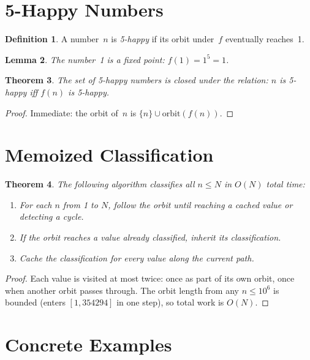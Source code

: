 \documentclass[11pt]{article}
\newtheorem{theorem}{Theorem}
\newtheorem{lemma}[theorem]{Lemma}
\theoremstyle{definition}
\newtheorem{definition}[theorem]{Definition}
\begin{document}
\section{5-Happy Numbers}

\begin{definition}
A number~$n$ is \emph{5-happy} if its orbit under~$f$ eventually reaches~1.
\end{definition}

\begin{lemma}
The number~1 is a fixed point: $f(1) = 1^5 = 1$.
\end{lemma}

\begin{theorem}
The set of 5-happy numbers is closed under the relation: $n$ is 5-happy iff $f(n)$ is 5-happy.
\end{theorem}

\begin{proof}
Immediate: the orbit of~$n$ is $\{n\} \cup \mathrm{orbit}(f(n))$.
\end{proof}

\section{Memoized Classification}

\begin{theorem}
The following algorithm classifies all $n \leq N$ in $O(N)$ total time:
\begin{enumerate}
    \item For each $n$ from 1 to $N$, follow the orbit until reaching a cached value or detecting a cycle.
    \item If the orbit reaches a value already classified, inherit its classification.
    \item Cache the classification for every value along the current path.
\end{enumerate}
\end{theorem}

\begin{proof}
Each value is visited at most twice: once as part of its own orbit, once when another orbit passes through. The orbit length from any $n \leq 10^6$ is bounded (enters $[1, 354294]$ in one step), so total work is $O(N)$.
\end{proof}

\section{Concrete Examples}
\end{document}
